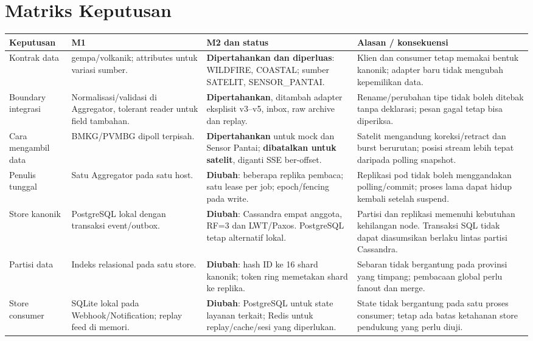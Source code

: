 \section{Matriks Keputusan}
\begin{longtable}{@{}P{2.2cm}P{3.65cm}P{4.2cm}P{5.05cm}@{}}
\toprule Keputusan & M1 & M2 dan status & Alasan / konsekuensi\\\midrule\endhead
Kontrak data &  gempa/volkanik; attributes untuk variasi sumber. & \textbf{Dipertahankan dan diperluas}: WILDFIRE, COASTAL; sumber SATELIT, SENSOR\_PANTAI. & Klien dan consumer tetap memakai bentuk kanonik; adapter baru tidak mengubah kepemilikan data.\\
Boundary integrasi & Normalisasi/validasi di Aggregator, tolerant reader untuk field tambahan. & \textbf{Dipertahankan}, ditambah adapter eksplisit v3--v5, inbox, raw archive dan replay. & Rename/perubahan tipe tidak boleh ditebak tanpa deklarasi; pesan gagal tetap bisa diperiksa.\\
Cara mengambil data & BMKG/PVMBG dipoll terpisah. & \textbf{Dipertahankan} untuk mock dan Sensor Pantai; \textbf{dibatalkan untuk satelit}, diganti SSE ber-offset. & Satelit mengandung koreksi/retract dan burst berurutan; posisi stream lebih tepat daripada polling snapshot.\\
Penulis tunggal & Satu Aggregator pada satu host. & \textbf{Diubah}: beberapa replika pembaca; satu lease per job; epoch/fencing pada write. & Replikasi pod tidak boleh menggandakan polling/commit; proses lama dapat hidup kembali setelah suspend.\\
Store kanonik & PostgreSQL lokal dengan transaksi event/outbox. & \textbf{Diubah}: Cassandra empat anggota, RF=3 dan LWT/Paxos. PostgreSQL tetap alternatif lokal. & Partisi dan replikasi memenuhi kebutuhan kehilangan node. Transaksi SQL tidak dapat diasumsikan berlaku lintas partisi Cassandra.\\
Partisi data & Indeks relasional pada satu store. & \textbf{Diubah}: hash ID ke 16 shard kanonik; token ring memetakan shard ke replika. & Sebaran tidak bergantung pada provinsi yang timpang; pembacaan global perlu fanout dan merge.\\
Store consumer & SQLite lokal pada Webhook/Notification; replay feed di memori. & \textbf{Diubah}: PostgreSQL untuk state layanan terkait; Redis untuk replay/cache/sesi yang diperlukan. & State tidak bergantung pada satu proses consumer; tetap ada batas ketahanan store pendukung yang perlu diuji.\\

\end{longtable}
